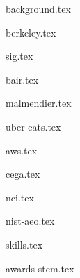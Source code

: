 \documentclass[11pt]{article}
\begin{document}
{background.tex}


{berkeley.tex}


{sig.tex}

{bair.tex}

{malmendier.tex}

{uber-eats.tex}

{aws.tex}

{cega.tex}

{nci.tex}

{nist-aeo.tex}


{skills.tex}


{awards-stem.tex}
\end{document}
